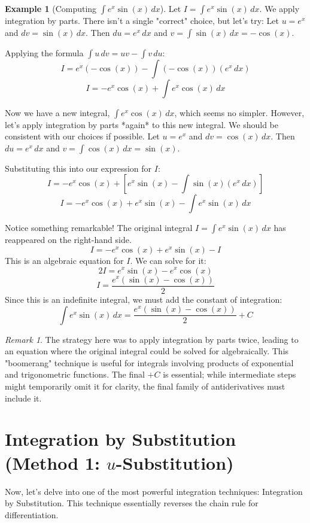 \documentclass[11pt]{article}
\theoremstyle{definition}
\newtheorem{example}[theorem]{Example}
\theoremstyle{remark}
\newtheorem{remark}[theorem]{Remark}
\begin{document}
\begin{example}[Computing $\int e^x \sin(x) \, dx$]
Let $I = \int e^x \sin(x) \, dx$. We apply integration by parts. There isn't a single "correct" choice, but let's try:
Let $u = e^x$ and $dv = \sin(x) \, dx$.
Then $du = e^x \, dx$ and $v = \int \sin(x) \, dx = -\cos(x)$.

Applying the formula $\int u \, dv = uv - \int v \, du$:
\[ I = e^x (-\cos(x)) - \int (-\cos(x)) (e^x \, dx) \]
\[ I = -e^x \cos(x) + \int e^x \cos(x) \, dx \]

Now we have a new integral, $\int e^x \cos(x) \, dx$, which seems no simpler. However, let's apply integration by parts *again* to this new integral. We should be consistent with our choices if possible.
Let $u = e^x$ and $dv = \cos(x) \, dx$.
Then $du = e^x \, dx$ and $v = \int \cos(x) \, dx = \sin(x)$.

Substituting this into our expression for $I$:
\[ I = -e^x \cos(x) + \left[ e^x \sin(x) - \int \sin(x) (e^x \, dx) \right] \]
\[ I = -e^x \cos(x) + e^x \sin(x) - \int e^x \sin(x) \, dx \]

Notice something remarkable! The original integral $I = \int e^x \sin(x) \, dx$ has reappeared on the right-hand side.
\[ I = -e^x \cos(x) + e^x \sin(x) - I \]
This is an algebraic equation for $I$. We can solve for it:
\[ 2I = e^x \sin(x) - e^x \cos(x) \]
\[ I = \frac{e^x (\sin(x) - \cos(x))}{2} \]
Since this is an indefinite integral, we must add the constant of integration:
\[ \int e^x \sin(x) \, dx = \frac{e^x (\sin(x) - \cos(x))}{2} + C \]
\end{example}

\begin{remark}
The strategy here was to apply integration by parts twice, leading to an equation where the original integral could be solved for algebraically. This "boomerang" technique is useful for integrals involving products of exponential and trigonometric functions. The final $+C$ is essential; while intermediate steps might temporarily omit it for clarity, the final family of antiderivatives must include it.
\end{remark}

\section{Integration by Substitution (Method 1: \texorpdfstring{$u$}{u}-Substitution)}

Now, let's delve into one of the most powerful integration techniques: Integration by Substitution. This technique essentially reverses the chain rule for differentiation.
\end{document}

